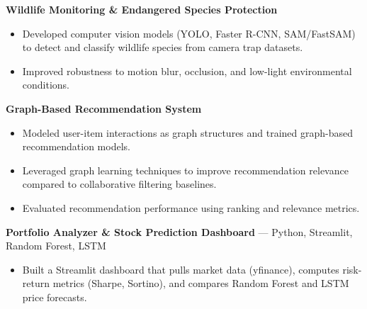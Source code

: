 \documentclass[a4paper,8pt]{extarticle}
\begin{document}
\noindent
\textbf{Wildlife Monitoring \& Endangered Species Protection}

\begin{itemize}
\item Developed computer vision models (YOLO, Faster R-CNN, SAM/FastSAM) to detect and classify wildlife species from camera trap datasets.
\item Improved robustness to motion blur, occlusion, and low-light environmental conditions.
\end{itemize}

\noindent
\textbf{Graph-Based Recommendation System}

\begin{itemize}
\item Modeled user-item interactions as graph structures and trained graph-based recommendation models.
\item Leveraged graph learning techniques to improve recommendation relevance compared to collaborative filtering baselines.
\item Evaluated recommendation performance using ranking and relevance metrics.
\end{itemize}

\noindent
\textbf{Portfolio Analyzer \& Stock Prediction Dashboard} --- Python, Streamlit, Random Forest, LSTM

\begin{itemize}
\item Built a Streamlit dashboard that pulls market data (yfinance), computes risk-return metrics (Sharpe, Sortino), and compares Random Forest and LSTM price forecasts.
\end{itemize}
\end{document}
